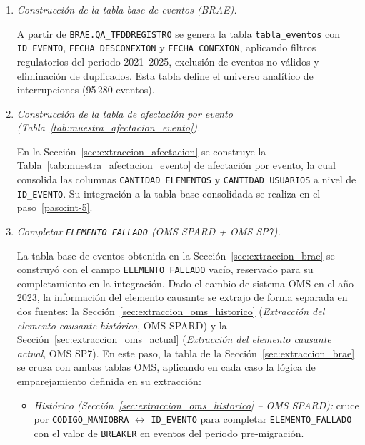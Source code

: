     {\sloppy
    \renewcommand{\theenumi}{\thesubsection.\arabic{enumi}}
    \renewcommand{\labelenumi}{\theenumi}
\begin{enumerate}
        \item\label{paso:int-1} \textit{Construcción de la tabla base de eventos (BRAE).}\mbox{}\par\vspace{0.2em}\noindent
        A partir de \texttt{BRAE.QA\_TFDDREGISTRO} se genera la tabla \texttt{tabla\_eventos} con \texttt{ID\_EVENTO}, \texttt{FECHA\_DESCONEXION} y \texttt{FECHA\_CONEXION}, aplicando filtros regulatorios del periodo 2021--2025, exclusión de eventos no válidos y eliminación de duplicados. Esta tabla define el universo analítico de interrupciones (95\,280 eventos).
    
        \item\label{paso:int-2} \textit{Construcción de la tabla de afectación por evento (Tabla~\ref{tab:muestra_afectacion_evento}).}\mbox{}\par\vspace{0.2em}\noindent
        En la Sección~\ref{sec:extraccion_afectacion} se construye la Tabla~\ref{tab:muestra_afectacion_evento} de afectación por evento, la cual consolida las columnas \texttt{CANTIDAD\_ELEMENTOS} y \texttt{CANTIDAD\_USUARIOS} a nivel de \texttt{ID\_EVENTO}. Su integración a la tabla base consolidada se realiza en el paso~\ref{paso:int-5}.
    
        \item\label{paso:int-3} \textit{Completar \texttt{ELEMENTO\_FALLADO} (OMS SPARD + OMS SP7).}\mbox{}\par\vspace{0.2em}\noindent
        La tabla base de eventos obtenida en la Sección~\ref{sec:extraccion_brae} se construyó con el campo \texttt{ELEMENTO\_FALLADO} vacío, reservado para su completamiento en la integración. Dado el cambio de sistema OMS en el año 2023, la información del elemento causante se extrajo de forma separada en dos fuentes: la Sección~\ref{sec:extraccion_oms_historico} (\emph{Extracción del elemento causante histórico}, OMS SPARD) y la Sección~\ref{sec:extraccion_oms_actual} (\emph{Extracción del elemento causante actual}, OMS SP7). En este paso, la tabla de la Sección~\ref{sec:extraccion_brae} se cruza con ambas tablas OMS, aplicando en cada caso la lógica de emparejamiento definida en su extracción:
        
        \begin{itemize}
            \item \textit{Histórico (Sección~\ref{sec:extraccion_oms_historico} -- OMS SPARD):} cruce por \texttt{CODIGO\_MANIOBRA} $\leftrightarrow$ \texttt{ID\_EVENTO} para completar \texttt{ELEMENTO\_FALLADO} con el valor de \texttt{BREAKER} en eventos del periodo pre-migración.
            

\end{itemize}
\end{enumerate}}
